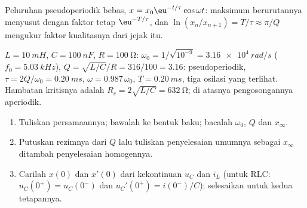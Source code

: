 \begin{omfigure}

{\small Peluruhan pseudoperiodik bebas, $x = x_0\eu^{-t/\tau}\cos\omega t$:
maksimum berurutannya menyusut dengan faktor tetap $\eu^{-T/\tau}$, dan
$\ln(x_n/x_{n+1}) = T/\tau \approx \pi/Q$ mengukur faktor kualitasnya
dari jejak itu.}
\end{omfigure}

\begin{example}\label{ex:b1:transient-regimes:rlcnum}
$L = \qty{10}{mH}$, $C = \qty{100}{nF}$, $R = \qty{100}{\ohm}$:
$\omega_0 = 1/\sqrt{10^{-9}} = \qty{3.16e4}{rad/s}$ ($f_0 =
\qty{5.03}{kHz}$), $Q = \sqrt{L/C}/R = 316/100 = 3.16$: pseudoperiodik,
$\tau = 2Q/\omega_0 = \qty{0.20}{ms}$, $\omega = 0.987\,\omega_0$,
$T = \qty{0.20}{ms}$, tiga osilasi yang terlihat. Hambatan kritisnya
adalah $R_c = 2\sqrt{L/C} = \qty{632}{\ohm}$; di atasnya pengosongannya
aperiodik.
\end{example}

\begin{method}\label{met:b1:transient-regimes:second}
\begin{enumerate}
  \item Tuliskan persamaannya; bawalah ke bentuk baku; bacalah
        $\omega_0$, $Q$ dan $x_\infty$.
  \item Putuskan rezimnya dari $Q$ lalu tuliskan penyelesaian umumnya
        sebagai $x_\infty$ ditambah penyelesaian homogennya.
  \item Carilah $x(0)$ dan $x'(0)$ dari kekontinuan $u_C$ dan $i_L$
        (untuk RLC: $u_C(0^+) = u_C(0^-)$ dan $u_C'(0^+) = i(0^-)/C$);
        selesaikan untuk kedua tetapannya.
\end{enumerate}
\end{method}

